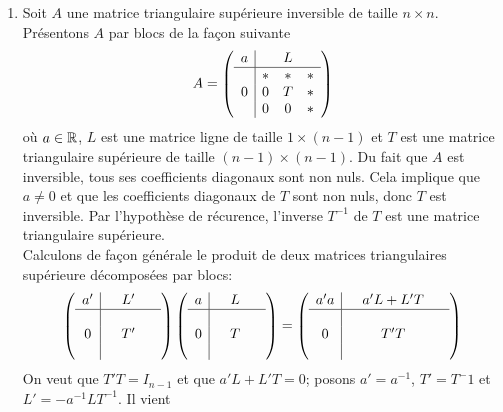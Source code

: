 {\begin{enumerate}[(1)]
    \item Soit $A$ une matrice triangulaire supérieure inversible de taille $n\times n$. Présentons $A$ par blocs de la façon suivante
      $$A = \left( \begin{array}{c|ccc}
        a &   & L &   \\ \hline
          & * & * & * \\
        0 & 0 & T & * \\
          & 0 & 0 & * \\
      \end{array} \right)$$
      où $a \in \mathbb{R}$, $L$ est une matrice ligne de taille $1 \times (n-1)$ et $T$ est une matrice triangulaire supérieure de taille $(n-1)\times(n-1)$. Du fait que $A$ est inversible, tous ses coefficients diagonaux sont non nuls. Cela implique que $a \neq 0$ et que les coefficients diagonaux de $T$ sont non nuls, donc $T$ est inversible. Par l'hypothèse de récurence, l'inverse $T^{-1}$ de $T$ est une matrice triangulaire supérieure. \\
      Calculons de façon générale le produit de deux matrices triangulaires supérieure décomposées par blocs:
      $$\left( \begin{array}{c|ccc}
          a' &   & L' & ~ \\ \hline
            &   &   &  ~  \\
          0 &   & T' & ~  \\
            &   &   &  ~ \\
        \end{array} \right)
        \left( \begin{array}{c|ccc}
          a &   & L &  ~ \\ \hline
            &   &   &  ~ \\
          0 &   & T &  ~ \\
            &   &   &  ~ \\
        \end{array} \right)
        =\left( \begin{array}{c|ccc}
          a' a &   & a' L + L' T & ~ \\ \hline
            &   &   & ~ \\
          0 &   & T' T & ~ \\
            &   &   & ~ \\
        \end{array} \right)$$
      On veut que $T' T = I_{n-1}$ et que $a' L + L' T = 0$; posons $a' = a^{-1}$, $T' = T^-{1}$ et $L' = - a^{-1} L T^{-1}$. Il vient

\end{enumerate}}
